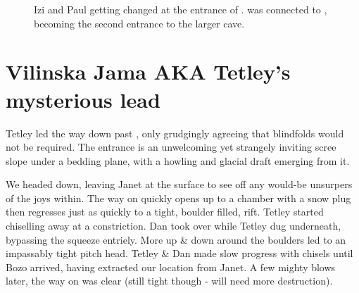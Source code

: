 \begin{figure}[t]
\checkoddpage \ifoddpage \forcerectofloat \else \forceversofloat \fi
{}
\caption{Izi and Paul getting changed at the entrance of \protect{}. \protect{} was connected to \protect{}, becoming the second entrance to the larger cave. }
\end{figure}

\section{Vilinska Jama AKA Tetley's mysterious lead}

Tetley led the way down past , only grudgingly agreeing that blindfolds would not be required. The entrance is an unwelcoming yet
strangely inviting scree slope under a bedding plane, with a howling and
glacial draft emerging from it.

We headed down, leaving Janet at the surface to see off any would-be
unsurpers of the joys within. The way on quickly opens up to a chamber
with a snow plug then regresses just as quickly to a tight, boulder
filled, rift. Tetley started chiselling away at a constriction. Dan took
over while Tetley dug underneath, bypassing the squeeze entriely. More
up \& down around the boulders led to an impassably tight pitch head.
Tetley \& Dan made slow progress with chisels until Bozo arrived, having
extracted our location from Janet. A few mighty blows later, the way on
was clear (still tight though - will need more destruction).

